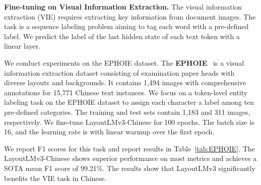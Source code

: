 \documentclass[sigconf]{acmart}
\begin{document}
\noindent \textbf{Fine-tuning on Visual Information Extraction.}
The visual information extraction (VIE) requires extracting key information from document images.
The task is a sequence labeling problem aiming to tag each word with a pre-defined label.
We predict the label of the last hidden state of each text token with a linear layer. 

We conduct experiments on the EPHOIE dataset.
The \textbf{EPHOIE}~\cite{wang2021towards} is a visual information extraction dataset consisting of examination paper heads with diverse layouts and backgrounds.
It contains 1,494 images with comprehensive annotations for 15,771 Chinese text instances.
We focus on a token-level entity labeling task on the EPHOIE dataset to assign each character a label among ten pre-defined categories.
The training and test sets contain 1,183 and 311 images, respectively.
We fine-tune LayoutLMv3-Chinese for 100 epochs. The batch size is 16, and the learning rate is  with linear warmup over the first epoch.

We report F1 scores for this task and report results in Table~\ref{tab:EPHOIE}.
The LayoutLMv3-Chinese shows superior performance on most metrics and achieves a SOTA mean F1 score of 99.21\%. The results show that LayoutLMv3 significantly benefits the VIE task in Chinese.





\balance

\end{document}
